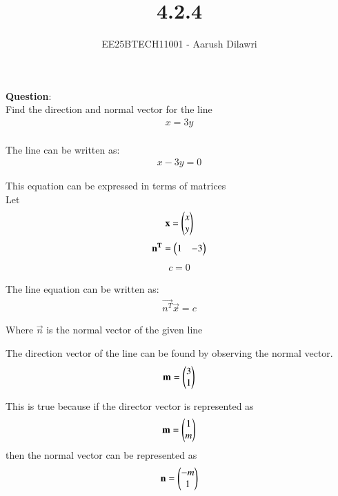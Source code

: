 \documentclass[journal]{IEEEtran}
\begin{document}

\vspace{3cm}

\title{4.2.4}
\author{EE25BTECH11001 - Aarush Dilawri}
\maketitle
{\let\newpage\relax\maketitle}

\renewcommand{\thefigure}{\theenumi}
\renewcommand{\thetable}{\theenumi}
\setlength{\intextsep}{10pt} %


\renewcommand{\thetable}{\theenumi}

\textbf{Question}:\\
Find the direction and normal vector for the line 
\begin{align}
x = 3y
\end{align}
\solution \\

The line can be written as: 
\begin{align}
x - 3y =0
\end{align}

This equation can be expressed in terms of matrices\\
Let
\begin{align}
\mathbf{x} = \begin{pmatrix}x \\ y\end{pmatrix}
\end{align}
\begin{align}
\mathbf{n^T} = \begin{pmatrix}1 & -3\end{pmatrix}
\end{align}
\begin{align}
c = 0
\end{align}

The line equation can be written as:
\begin{align}
\vec{n^T}  \vec{x} = c
\end{align}

Where $\vec{n}$ is the normal vector of the given line

The direction vector of the line can be found by observing the normal vector.
\begin{align}
\mathbf{m} = \begin{pmatrix}3 \\ 1\end{pmatrix}
\end{align}


This is true because if the director vector is represented as 
\begin{align}
\mathbf{m}  = \begin{pmatrix}1 \\ m\end{pmatrix}    
\end{align}
then the normal vector can be represented as 
\begin{align}
\mathbf{n} = \begin{pmatrix}-m \\ 1\end{pmatrix}
\end{align}
\end{document}

